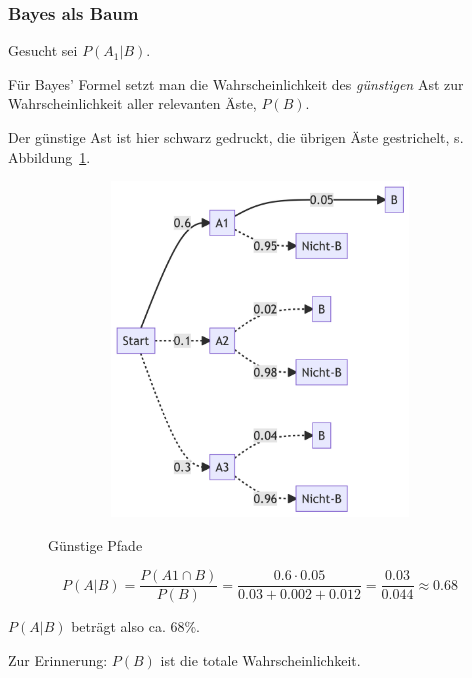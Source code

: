 \documentclass[
  a4paper,
  DIV=11]{scrreprt}
\theoremstyle{definition}
\theoremstyle{remark}
\begin{document}
\hypertarget{bayes-als-baum}{%
\subsubsection{Bayes als Baum}\label{bayes-als-baum}}

Gesucht sei \(P(A_1|B)\).

Für Bayes' Formel setzt man die Wahrscheinlichkeit des \emph{günstigen}
Ast zur Wahrscheinlichkeit aller relevanten Äste, \(P(B)\).

Der günstige Ast ist hier schwarz gedruckt, die übrigen Äste
gestrichelt, s. Abbildung~\ref{fig-tot-wskt2}.

\begin{figure}

{\centering 

\begin{figure}[H]

{\centering \includegraphics[width=5.5in,height=3.5in]{./Wskt_files/figure-latex/mermaid-figure-2.png}

}

\end{figure}

}

\caption{\label{fig-tot-wskt2}Günstige Pfade}

\end{figure}

\[P(A|B) = \frac{P(A1 \cap B)}{P(B)} = \frac{0.6 \cdot 0.05}{0.03 + 0.002 + 0.012} = \frac{0.03}{0.044} \approx 0.68\]

\(P(A|B)\) beträgt also ca. 68\%.

Zur Erinnerung: \(P(B)\) ist die totale Wahrscheinlichkeit.
\end{document}

